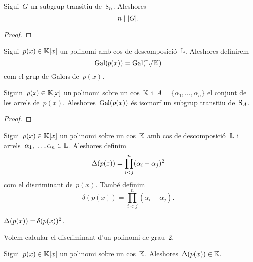 \documentclass[../Apunts.tex]{subfiles}
\begin{document}
	\begin{proposition}
		\label{prop:l'ordre d'un subgrup transitiu divideix n}
		Sigui~\(G\) un subgrup transitiu de~\(\operatorname{S}_{n}\). Aleshores
		\[n\divides\card{G}.\]
		\begin{proof}
		\end{proof}
	\end{proposition}
	\begin{definition}
		\label{def:grup de Galois d'un polinomi}
		Sigui~\(p(x)\in\mathbb{K}[x]\) un polinomi amb cos de descomposició~\(\mathbb{L}\). Aleshores definirem
		\[\operatorname{Gal}(p(x))=\operatorname{Gal}(\mathbb{L}/\mathbb{K})\]
		com el grup de Galois de~\(p(x)\).
	\end{definition}
	\begin{corollary}
		\label{cor:grup de Galois d'una extensió amb un cos de descomposició}
		Siguin~\(p(x)\in\mathbb{K}[x]\) un polinomi sobre un cos~\(\mathbb{K}\) i~\(A=\{\alpha_{1},\dots,\alpha_{n}\}\) el conjunt de les arrels de~\(p(x)\). Aleshores~\(\operatorname{Gal}(p(x))\) és isomorf un subgrup transitiu de~\(\operatorname{S}_{A}\).
		\begin{proof}
		\end{proof}
	\end{corollary}
	\begin{definition}[Discriminant]
		\label{def:discriminant}
		Sigui~\(p(x)\in\mathbb{K}[x]\) un polinomi sobre un cos~\(\mathbb{K}\) amb cos de descomposició~\(\mathbb{L}\) i arrels~\(\alpha_{1},\dots,\alpha_{n}\in\mathbb{L}\). Aleshores definim
		\[\Delta(p(x))=\prod_{i<j}^{n}(\alpha_{i}-\alpha_{j})^{2}\]
		com el discriminant de~\(p(x)\). També definim
		\[\delta(p(x))=\prod_{i<j}^{n}(\alpha_{i}-\alpha_{j}).\]
	\end{definition}
	\begin{observation}
		\label{obs:discriminant}
		\(\Delta(p(x))=\delta(p(x))^{2}\).
	\end{observation}
	\begin{example}
		\label{ex:discriminant d'un polinomi quadràtic}
		Volem calcular el discriminant d'un polinomi de grau~\(2\).	
		\begin{solution}
		\end{solution}
	\end{example}
	\begin{proposition}
		\label{prop:el discriminant pertany al cos del polinomi}
		Sigui~\(p(x)\in\mathbb{K}[x]\) un polinomi sobre un cos~\(\mathbb{K}\). Aleshores~\(\Delta(p(x))\in\mathbb{K}\).
	\end{proposition}
\end{document}

